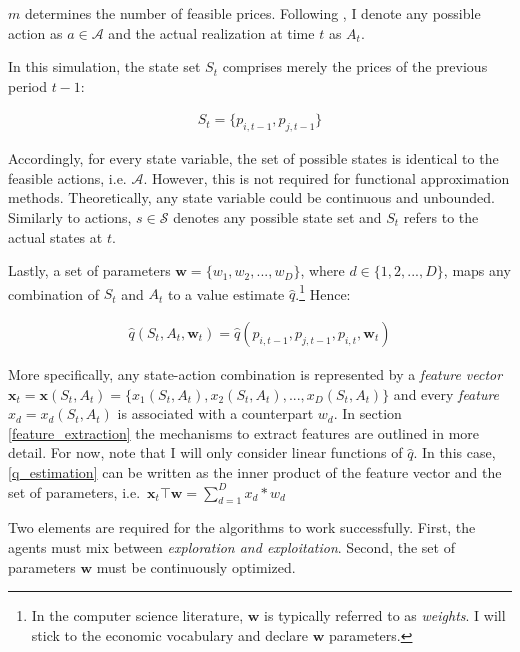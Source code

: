 $m$ determines the number of feasible prices. Following \textcite{sutton_reinforcement_2018}, I denote any possible action as $a \in \mathcal{A}$ and the actual realization at time $t$ as $A_t$.

In this simulation, the state set $S_t$ comprises merely the prices of the previous period $t-1$:

\begin{gather}
S_t = \{ p_{i, t-1}, p_{j, t-1} \}
\end{gather}


Accordingly, for every state variable, the set of possible states is identical to the feasible actions, i.e. $\mathcal{A}$. However, this is not required for functional approximation methods. Theoretically, any state variable could be continuous and unbounded. Similarly to actions, $s \in \mathcal{S}$ denotes any possible state set and $S_t$ refers to the actual states at $t$.






Lastly, a set of parameters $\boldsymbol{w} = \{w_1, w_2, ..., w_D\}$, where $d \in \{1, 2, ..., D\}$, maps any combination of $S_t$ and $A_t$ to a value estimate $\hat{q}$.\footnote{In the computer science literature, $\boldsymbol{w}$ is typically referred to as \emph{weights}. I will stick to the economic vocabulary and declare $\boldsymbol{w}$ parameters.} Hence:

\begin{gather}\label{q_estimation}
	\hat{q}(S_t,A_t,\boldsymbol{w}_t) = \hat{q}(p_{i, t-1}, p_{j, t-1}, p_{i, t}, \boldsymbol{w}_t)
\end{gather}

More specifically, any state-action combination is represented by a \emph{feature vector} $\boldsymbol{x}_t = \boldsymbol{x}(S_t, A_t) = \{x_1(S_t, A_t), x_2(S_t, A_t), ..., x_D(S_t, A_t)\}$ and every \emph{feature} $x_d = x_d(S_t, A_t)$ is associated with a counterpart $w_d$. In section \ref{feature_extraction} the mechanisms to extract features are outlined in more detail. For now, note that I will only consider linear functions of $\hat{q}$. In this case, \autoref{q_estimation} can be written as the inner product of the feature vector and the set of parameters, i.e.\ $\boldsymbol{x}_t \top \boldsymbol{w} = \sum_{d=1}^{D} x_d * w_d$

Two elements are required for the algorithms to work successfully. First, the agents must mix between \emph{exploration and exploitation}. Second, the set of parameters $\boldsymbol{w}$ must be continuously optimized.

